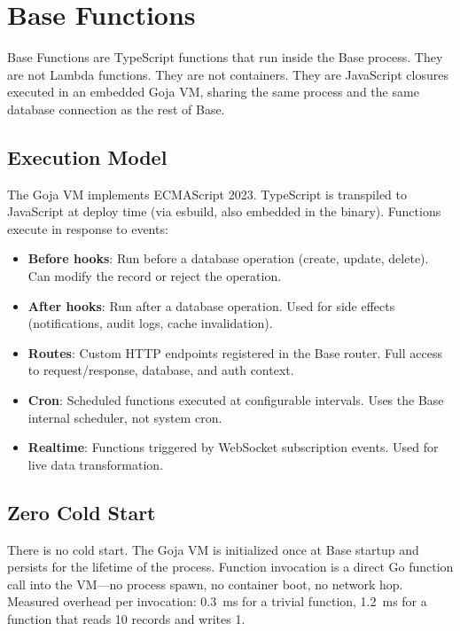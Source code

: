 \section{Base Functions}

\label{sec:functions}

Base Functions are TypeScript functions that run inside the Base process. They
are not Lambda functions. They are not containers. They are JavaScript closures
executed in an embedded Goja VM, sharing the same process and the same database
connection as the rest of Base.

\subsection{Execution Model}

The Goja VM implements ECMAScript 2023. TypeScript is transpiled to JavaScript
at deploy time (via esbuild, also embedded in the binary). Functions execute
in response to events:

\begin{itemize}[leftmargin=1.1em]
    \item \textbf{Before hooks}: Run before a database operation (create, update,
    delete). Can modify the record or reject the operation.
    \item \textbf{After hooks}: Run after a database operation. Used for
    side effects (notifications, audit logs, cache invalidation).
    \item \textbf{Routes}: Custom HTTP endpoints registered in the Base router.
    Full access to request/response, database, and auth context.
    \item \textbf{Cron}: Scheduled functions executed at configurable intervals.
    Uses the Base internal scheduler, not system cron.
    \item \textbf{Realtime}: Functions triggered by WebSocket subscription
    events. Used for live data transformation.
\end{itemize}

\subsection{Zero Cold Start}

There is no cold start. The Goja VM is initialized once at Base startup and
persists for the lifetime of the process. Function invocation is a direct
Go function call into the VM---no process spawn, no container boot, no
network hop. Measured overhead per invocation: 0.3~ms for a trivial function,
1.2~ms for a function that reads 10 records and writes 1.

